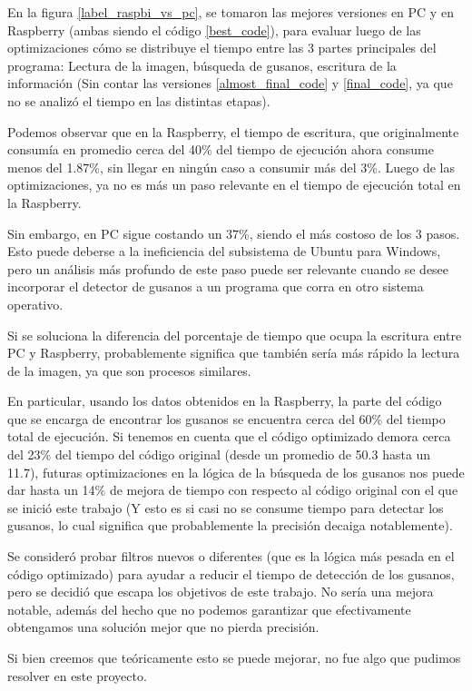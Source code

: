 \documentclass{article}
\begin{document}
En la figura \ref{label_raspbi_vs_pc}, se tomaron las mejores versiones en PC y en Raspberry (ambas siendo el código \ref{best_code}), para evaluar luego de las optimizaciones cómo se distribuye el tiempo entre las 3 partes principales del programa: Lectura de la imagen, búsqueda de gusanos, escritura de la información (Sin contar las versiones \ref{almost_final_code} y \ref{final_code}, ya que no se analizó el tiempo en las distintas etapas).

Podemos observar que en la Raspberry, el tiempo de escritura, que originalmente consumía en promedio cerca del 40\% del tiempo de ejecución ahora consume menos del 1.87\%, sin llegar en ningún caso a consumir más del 3\%. Luego de las optimizaciones, ya no es más un paso relevante en el tiempo de ejecución total en la Raspberry.

Sin embargo, en PC sigue costando un 37\%, siendo el más costoso de los 3 pasos. Esto puede deberse a la ineficiencia del subsistema de Ubuntu para Windows, pero un análisis más profundo de este paso puede ser relevante cuando se desee incorporar el detector de gusanos a un programa que corra en otro sistema operativo.

Si se soluciona la diferencia del porcentaje de tiempo que ocupa la escritura entre PC y Raspberry, probablemente significa que también sería más rápido la lectura de la imagen, ya que son procesos similares.

En particular, usando los datos obtenidos en la Raspberry, la parte del código que se encarga de encontrar los gusanos se encuentra cerca del 60\% del tiempo total de ejecución. Si tenemos en cuenta que el código optimizado demora cerca del 23\% del tiempo del código original (desde un promedio de 50.3 hasta un 11.7), futuras optimizaciones en la lógica de la búsqueda de los gusanos nos puede dar hasta un 14\% de mejora de tiempo con respecto al código original con el que se inició este trabajo (Y esto es si casi no se consume tiempo para detectar los gusanos, lo cual significa que probablemente la precisión decaiga notablemente).

Se consideró probar filtros nuevos o diferentes (que es la lógica más pesada en el código optimizado) para ayudar a reducir el tiempo de detección de los gusanos, pero se decidió que escapa los objetivos de este trabajo. No sería una mejora notable, además del hecho que no podemos garantizar que efectivamente obtengamos una solución mejor que no pierda precisión.

Si bien creemos que teóricamente esto se puede mejorar, no fue algo que pudimos resolver en este proyecto.
\end{document}
